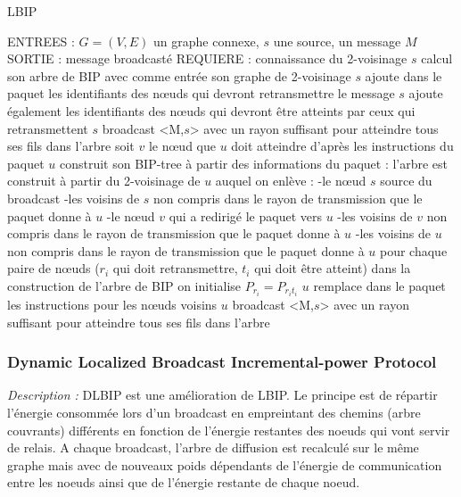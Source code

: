 \begin{algorithm}[H]
\caption{LBIP}
\label{algo_LBIP}
\begin{algorithmic}
\STATE ENTREES : $G=(V,E)$ un graphe connexe, $s$ une source, un message $M$
\STATE SORTIE : message broadcasté
\STATE REQUIERE : connaissance du 2-voisinage
\STATE $s$ calcul son arbre de BIP avec comme entrée son graphe de 2-voisinage
\STATE $s$ ajoute dans le paquet les identifiants des nœuds qui devront retransmettre le message
\STATE $s$ ajoute également les identifiants des nœuds qui devront être atteints par ceux qui retransmettent
\STATE $s$ broadcast <M,$s$> avec un rayon suffisant pour atteindre tous ses fils dans l'arbre
		\STATE soit $v$ le nœud que $u$ doit atteindre d'après les instructions du paquet
		\STATE $u$ construit son BIP-tree à partir des informations du paquet :
			 \INDSTATE l'arbre est construit à partir du 2-voisinage de $u$ auquel on enlève :
			 	 \INDSTATE[2]-le nœud $s$ source du broadcast
				 \INDSTATE[2]-les voisins de $s$ non compris dans le rayon de transmission que le paquet donne à $u$
				 \INDSTATE[2]-le nœud $v$ qui a redirigé le paquet vers $u$
				 \INDSTATE[2]-les voisins de $v$ non compris dans le rayon de transmission que le paquet donne à $u$
				 \INDSTATE[2]-les voisins de $u$ non compris dans le rayon de transmission que le paquet donne à $u$
			\INDSTATE[1] pour chaque paire de nœuds ($r_i$ qui doit retransmettre, $t_i$ qui doit être atteint)
				\INDSTATE[2] dans la construction de l'arbre de BIP on initialise $P_{r_i} = P_{r_i t_i}$
			\INDSTATE[1] $u$ remplace dans le paquet les instructions pour les nœuds voisins
			\INDSTATE[1] $u$ broadcast <M,$s$> avec un rayon suffisant pour atteindre tous ses fils dans l'arbre
	\ENDIF
\ENDIF
\end{algorithmic}
\end{algorithm}



\subsubsection{Dynamic Localized Broadcast Incremental-power Protocol \cite{Champ2009DLBIP}}

\emph{Description :} DLBIP est une amélioration de LBIP. Le principe est de répartir l'énergie consommée lors 
d'un broadcast en empreintant des chemins (arbre couvrants) différents en fonction de l'énergie restantes des 
noeuds qui vont servir de relais. A chaque broadcast, l'arbre de diffusion est recalculé sur le même graphe mais
avec de nouveaux poids dépendants de l'énergie de communication entre les noeuds ainsi que de l'énergie restante
de chaque noeud.


